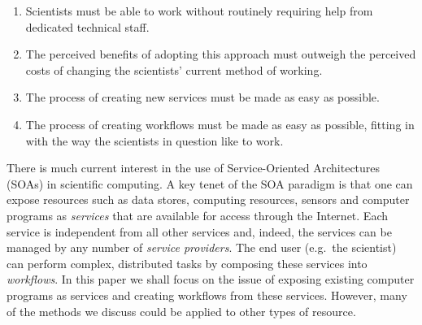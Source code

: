 \documentclass{llncs}
\begin{document}
\begin{enumerate}
	\item Scientists must be able to work without routinely requiring help from dedicated technical staff.
	\item The perceived benefits of adopting this approach must outweigh the perceived costs of changing the scientists' current method of working.
	\item The process of creating new services must be made as easy as possible.
	\item The process of creating workflows must be made as easy as possible, fitting in with the way the scientists in question like to work.
\end{enumerate}



There is much current interest in the use of Service-Oriented Architectures (SOAs) in scientific computing.  A key tenet of the SOA paradigm is that one can expose resources such as data stores, computing resources, sensors and computer programs as {\em services\/} that are available for access through the Internet.  Each service is independent from all other services and, indeed, the services can be managed by any number of {\em service providers\/}.  The end user (e.g.\ the scientist) can perform complex, distributed tasks by composing these services into {\em workflows\/}.  In this paper we shall focus on the issue of exposing existing computer programs as services and creating workflows from these services.  However, many of the methods we discuss could be applied to other types of resource.
\end{document}
